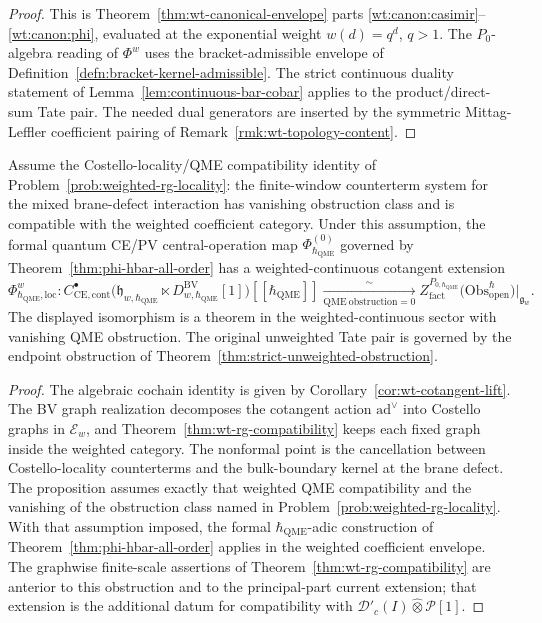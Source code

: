 \begin{proof}
  This is Theorem~\ref{thm:wt-canonical-envelope} parts
  \ref{wt:canon:casimir}--\ref{wt:canon:phi}, evaluated at the
  exponential weight $w(d)=q^d$, $q>1$. The
  $P_0$-algebra reading of $\Phi^w$ uses the bracket-admissible envelope
  of Definition~\ref{defn:bracket-kernel-admissible}.  The strict
  continuous duality statement of
  Lemma~\ref{lem:continuous-bar-cobar} applies to the product/direct-sum
  Tate pair. The needed dual generators are inserted by the symmetric
  Mittag-Leffler coefficient pairing of
  Remark~\ref{rmk:wt-topology-content}.
\end{proof}

\begin{prop}\label{prop:wt-qme-lift-obstruction-vanishing}
  Assume the Costello-locality/QME compatibility identity of
  Problem~\ref{prob:weighted-rg-locality}: the finite-window
  counterterm system for the mixed brane-defect interaction has
  vanishing obstruction class and is compatible with the weighted
  coefficient category.  Under this assumption, the formal quantum
  CE/PV central-operation map $\Phi_{\hbar_{\mathrm{QME}}}^{(0)}$ governed by
  Theorem~\ref{thm:phi-hbar-all-order} has a weighted-continuous
  cotangent extension
  $$\Phi_{\hbar_{\mathrm{QME}},\mathrm{loc}}^{w}\colon
    C^\bullet_{\mathrm{CE},\mathrm{cont}}\bigl(
    \mathfrak h_{w,\hbar_{\mathrm{QME}}}\ltimes
    D^{\mathrm{BV}}_{w,\hbar_{\mathrm{QME}}}[1]\bigr)[[\hbar_{\mathrm{QME}}]]
    \xrightarrow[\mathrm{QME\ obstruction}=0]{\sim}
    Z^{P_{0,\hbar_{\mathrm{QME}}}}_{\mathrm{fact}}\bigl(
    \mathrm{Obs}^\hbar_{\mathrm{open}}\bigr)|_{\mathfrak g_w}.$$
  The displayed isomorphism is a theorem in the weighted-continuous
  sector with vanishing QME obstruction.  The original unweighted Tate
  pair is governed by the endpoint obstruction of
  Theorem~\ref{thm:strict-unweighted-obstruction}.
\end{prop}

\begin{proof}
  The algebraic cochain identity is given by
  Corollary~\ref{cor:wt-cotangent-lift}.  The BV graph realization
  decomposes the cotangent action $\mathrm{ad}^\vee$ into Costello
  graphs in $\mathcal E_w$, and
  Theorem~\ref{thm:wt-rg-compatibility} keeps each fixed graph inside
  the weighted category.  The nonformal point is the cancellation
  between Costello-locality counterterms and the bulk-boundary kernel
  at the brane defect.  The proposition assumes exactly that weighted
  QME compatibility and the vanishing of the obstruction class named in
  Problem~\ref{prob:weighted-rg-locality}.  With that assumption
  imposed, the formal $\hbar_{\mathrm{QME}}$-adic construction of
  Theorem~\ref{thm:phi-hbar-all-order} applies in the weighted
  coefficient envelope.  The graphwise finite-scale assertions of
  Theorem~\ref{thm:wt-rg-compatibility} are anterior to this obstruction
  and to the principal-part current extension; that extension is the
  additional datum for compatibility with
  \(\mathcal D'_c(I)\widehat\otimes\mathcal P[1]\).
\end{proof}

